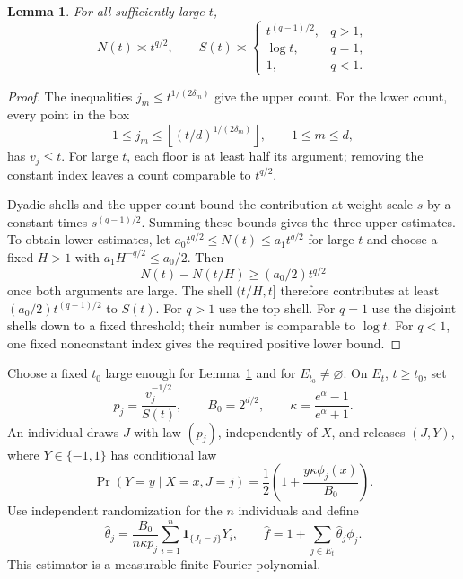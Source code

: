 \documentclass[11pt]{article}
\newtheorem{lemma}[theorem]{Lemma}
\newcommand{\ind}{\mathbf 1}
\begin{document}
\begin{lemma}\label{lem:count}
For all sufficiently large $t$,
\[
 N(t)\asymp t^{q/2},\qquad
 S(t)\asymp\begin{cases}
 t^{(q-1)/2},&q>1,\\
 \log t,&q=1,\\
 1,&q<1.
 \end{cases}
\]
\end{lemma}
\begin{proof}
The inequalities $j_m\le t^{1/(2\delta_m)}$ give the upper count.
For the lower count, every point in the box
\[
 1\le j_m\le\left\lfloor(t/d)^{1/(2\delta_m)}\right\rfloor,
 \qquad 1\le m\le d,
\]
has $v_j\le t$. For large $t$, each floor is at least half its argument;
removing the constant index leaves a count comparable to $t^{q/2}$.

Dyadic shells and the upper count bound the contribution at weight scale $s$
by a constant times $s^{(q-1)/2}$. Summing these bounds gives the three upper
estimates. To obtain lower estimates, let $a_0t^{q/2}\le N(t)\le a_1t^{q/2}$
for large $t$ and choose a fixed $H>1$ with
$a_1H^{-q/2}\le a_0/2$. Then
\[
 N(t)-N(t/H)\ge (a_0/2)t^{q/2}
\]
once both arguments are large. The shell $(t/H,t]$ therefore contributes
at least $(a_0/2)t^{(q-1)/2}$ to $S(t)$. For $q>1$ use the top shell.
For $q=1$ use the disjoint shells down to a fixed threshold; their number is
comparable to $\log t$. For $q<1$, one fixed nonconstant index gives the
required positive lower bound.
\end{proof}

Choose a fixed $t_0$ large enough for Lemma~\ref{lem:count} and for
$E_{t_0}\ne\varnothing$. On $E_t$, $t\ge t_0$, set
\begin{equation}\label{eq:sampling}
 p_j=\frac{v_j^{-1/2}}{S(t)},\qquad
 B_0=2^{d/2},\qquad \kappa=\frac{e^\alpha-1}{e^\alpha+1}.
\end{equation}
An individual draws $J$ with law $(p_j)$, independently of $X$, and releases
$(J,Y)$, where $Y\in\{-1,1\}$ has conditional law
\begin{equation}\label{eq:channel}
 \Pr(Y=y\mid X=x,J=j)=\frac12
 \left(1+\frac{y\kappa\phi_j(x)}{B_0}\right).
\end{equation}
Use independent randomization for the $n$ individuals and define
\begin{equation}\label{eq:estimator}
 \widehat\theta_j=\frac{B_0}{n\kappa p_j}
 \sum_{i=1}^n\ind_{\{J_i=j\}}Y_i,\qquad
 \widehat f=1+\sum_{j\in E_t}\widehat\theta_j\phi_j.
\end{equation}
This estimator is a measurable finite Fourier polynomial.
\end{document}
